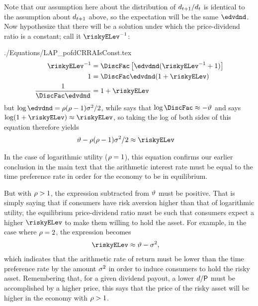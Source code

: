 \documentclass{\handout}
\begin{document}
Note that our assumption here about the distribution of $d_{t+1}/d_{t}$ is identical to the assumption about $d_{t+1}$ above, so the expectation will be the same $\edvdnd$.  Now hypothesize that there will be a solution under which the price-dividend ratio is a constant; call it $\riskyELev^{-1}$:  
\begin{verbatimwrite}{./Equations/LAP_pofdCRRAIsConst.tex}
\begin{equation}\begin{gathered}\begin{aligned}
\riskyELev^{-1}  & =   \DiscFac  \left[\edvdnd(\riskyELev^{-1}+1)\right] 
\\ 1 & =  \DiscFac \edvdnd (1+\riskyELev)
\\ \frac{1}{\DiscFac \edvdnd} & = 1+\riskyELev
\end{aligned}\end{gathered}\end{equation}
but $\log \edvdnd = \CRRA(\CRRA-1)\riskyvar/2$, while  says that $\log \DiscFac \approx -\timeRate$ and  says $\log(1+\riskyELev)\approx\riskyELev$, so taking the log of both sides of this equation therefore yields
\begin{equation}\begin{gathered}\begin{aligned}
 \timeRate - \CRRA(\CRRA-1)\riskyvar/2 & \approx \riskyELev
\end{aligned}\end{gathered}\end{equation}
\end{verbatimwrite}


In the case of logarithmic utility ($\rho=1$), this equation confirms our earlier conclusion in the main text that the arithmetic interest rate must be equal to the time preference rate in order for the economy to be in equilibrium.

But with $\rho > 1$, the expression subtracted from $\vartheta$ must be positive.  That is simply saying that if consumers have risk aversion higher than that of logarithmic utility, the equilibrium price-dividend ratio must be such that consumers expect a higher $\riskyELev$ to make them willing to hold the asset.  For example, in the case where $\rho=2$, the expression becomes 
\begin{equation}\begin{gathered}\begin{aligned}
 \riskyELev  & \approx \timeRate - \riskyvar,
\end{aligned}\end{gathered}\end{equation}
which indicates that the arithmetic rate of return must be lower than the time preference rate by the amount $\sigma^{2}$ in order to induce consumers to hold the risky asset.  Remembering that, for a given dividend payout, a lower $d/\mathsf{P}$ must be accomplished by a higher price, this says that the price of the risky asset will be higher in the economy with $\rho > 1$.
\end{document}
